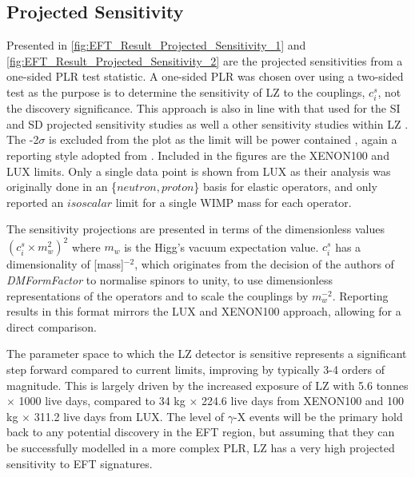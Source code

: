 \subsection{Projected Sensitivity}
\par
Presented in \autoref{fig:EFT_Result_Projected_Sensitivity_1} and \autoref{fig:EFT_Result_Projected_Sensitivity_2} are the projected sensitivities from a one-sided PLR test statistic.
A one-sided PLR was chosen over using a two-sided test as the purpose is to determine the sensitivity of LZ to the couplings, $c^s_i$, not the discovery significance. 
This approach is also in line with that used for the SI and SD projected sensitivity studies \cite{LZ_projected_sensitivity_paper_ref} as well a other sensitivity studies within LZ \cite{LZ_Ibles_LZStats_Thesis_ref, umituktu_thesis_ref}.
The -2$\sigma$ is excluded from the plot as the limit will be power contained \cite{power_constrained_limits_ref}, again a reporting style adopted from \cite{LZ_projected_sensitivity_paper_ref}.
Included in the figures are the XENON100 \cite{xenon100_eft_ref} and LUX \cite{LUX_RUN4_EFT_2021} limits.
Only a single data point is shown from LUX as their analysis was originally done in an \{$neutron,proton$\} basis for elastic operators, and only reported an $isoscalar$ limit for a single WIMP mass for each operator.
\par
The sensitivity projections are presented in terms of the dimensionless values $({c}^{s}_{i}\times{m}^{2}_{w})^{2}$ where $m_w$ is the Higg's vacuum expectation value.
${c}^{s}_{i}$ has a dimensionality of [mass]$^{-2}$, which originates from the decision of the authors of \textit{DMFormFactor} to normalise spinors to unity, to use dimensionless representations of the operators and to scale the couplings by $m^{-2}_w$.
Reporting results in this format mirrors the LUX and XENON100 approach, allowing for a direct comparison.
\par
The parameter space to which the LZ detector is sensitive represents a significant step forward compared to current limits, improving by typically 3-4 orders of magnitude.
This is largely driven by the increased exposure of LZ with 5.6 tonnes $\times$ 1000 live days, compared to 34 kg $\times$ 224.6 live days from XENON100 and 100 kg $\times$ 311.2 live days from LUX.
The level of $\gamma$-X events will be the primary hold back to any potential discovery in the EFT region, but assuming that they can be successfully modelled in a more complex PLR, LZ has a very high projected sensitivity to EFT signatures.

